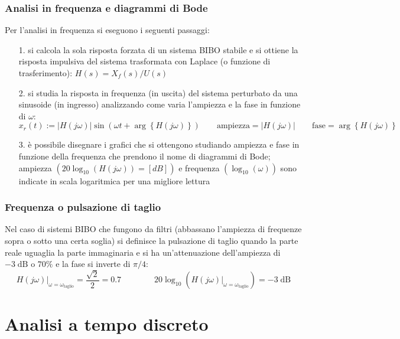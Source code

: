 \subsubsection*{Analisi in frequenza e diagrammi di Bode}
Per l'analisi in frequenza si eseguono i seguenti passaggi:
\begin{itemize}
	\item[1.] si calcola la sola risposta forzata di un sistema BIBO stabile e si ottiene la risposta impulsiva del sistema trasformata
	con Laplace (o funzione di trasferimento): \(H(s) = X_f(s) / U(s)\)
	\item[2.] si studia la risposta in frequenza (in uscita) del sistema perturbato da una sinusoide (in ingresso) analizzando come
	varia l'ampiezza e la fase in funzione di \(\omega\):
	\[x_r(t) := \left|H(j\omega)\right| \sin (\omega t + \arg{\left\{H(j\omega)\right\}}) \qquad \text{ampiezza} = \left|H(j\omega)\right| \qquad \text{fase} = \arg{\left\{H(j\omega)\right\}}\]
	\item[3.] è possibile disegnare i grafici che si ottengono studiando ampiezza e fase in funzione della frequenza che prendono il
	nome di diagrammi di Bode; ampiezza \((20\log_{10}(H(j\omega)) = [dB])\) e frequenza \((\log_{10}(\omega))\) sono indicate in
	scala logaritmica per una migliore lettura
\end{itemize}

\subsubsection*{Frequenza o pulsazione di taglio}
Nel caso di sistemi BIBO che fungono da filtri (abbassano l'ampiezza di frequenze sopra o sotto una certa soglia) si definisce la
pulsazione di taglio quando la parte reale uguaglia la parte immaginaria e si ha un'attenuazione dell'ampiezza di \(-3 \; \text{dB}\)
o \(70\%\) e la fase si inverte di \(\pi/4\):
\[\left. H(j\omega) \right|_{\omega = \omega_\text{taglio}} = \frac{\sqrt{2}}{2} = 0.7 \qquad\qquad 20\log_{10}\left(\left. H(j\omega) \right|_{\omega = \omega_\text{taglio}}\right) = -3 \; \text{dB}\]

\newpage


\section{Analisi a tempo discreto}
